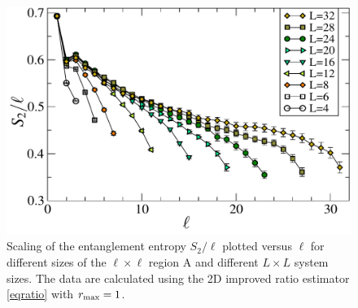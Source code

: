\begin{figure} {
	\includegraphics[width=5in]{./figures/paper2/fig_AreaL/fig4.pdf} 
	\centering
	\caption[Area law for $S_2$ in the N\'eel state using $L \times L$ systems with periodic boundaries]{
Scaling of the entanglement entropy $S_2/\ell$ plotted versus $\ell$ for different sizes of the $\ell \times \ell$ region A and different $L \times L$ system sizes. 
The data are calculated using the 2D improved ratio estimator \eqref{eqratio} with $r_{\rm max} = 1$.
	\label{2Darea}
	}
} \end{figure}

